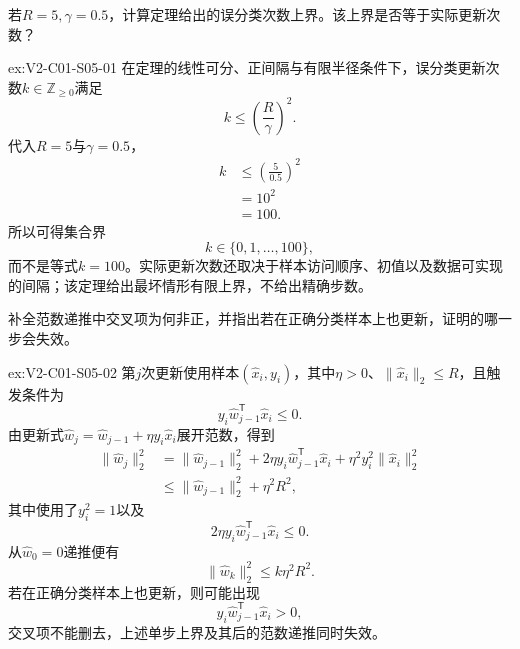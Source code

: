\begin{SLChapterExercisePairSection}
\begin{exercise}\label{ex:V2-C01-S05-01}
若$R=5,\gamma=0.5$，计算定理给出的误分类次数上界。该上界是否等于实际更新次数？
\end{exercise}
\ifSLFullEdition
{}\label{sol:V2-C01-S05-01}
\begin{chapterexercisesolution}{ex:V2-C01-S05-01}
在定理的线性可分、正间隔与有限半径条件下，误分类更新次数$k\in\mathbb Z_{\geq0}$满足
\[
k\leq\left(\frac{R}{\gamma}\right)^2.
\]
代入$R=5$与$\gamma=0.5$，
\[
\begin{aligned}
k
&\leq\left(\frac{5}{0.5}\right)^2\\
&=10^2\\
&=100.
\end{aligned}
\]
所以可得集合界
\[
k\in\{0,1,\ldots,100\},
\]
而不是等式$k=100$。实际更新次数还取决于样本访问顺序、初值以及数据可实现的间隔；该定理给出最坏情形有限上界，不给出精确步数。
\end{chapterexercisesolution}
\fi

\begin{exercise}\label{ex:V2-C01-S05-02}
补全范数递推中交叉项为何非正，并指出若在正确分类样本上也更新，证明的哪一步会失效。
\end{exercise}
\ifSLFullEdition
{}\label{sol:V2-C01-S05-02}
\begin{chapterexercisesolution}{ex:V2-C01-S05-02}
第$j$次更新使用样本$(\widehat x_i,y_i)$，其中$\eta>0$、$\lVert\widehat x_i\rVert_2\leq R$，且触发条件为
\[
y_i\widehat w_{j-1}^{\mathsf T}\widehat x_i\leq0.
\]
由更新式$\widehat w_j=\widehat w_{j-1}+\eta y_i\widehat x_i$展开范数，得到
\[
\begin{aligned}
\lVert\widehat w_j\rVert_2^2
&=\lVert\widehat w_{j-1}\rVert_2^2
+2\eta y_i\widehat w_{j-1}^{\mathsf T}\widehat x_i
+\eta^2y_i^2\lVert\widehat x_i\rVert_2^2\\
&\leq\lVert\widehat w_{j-1}\rVert_2^2
+\eta^2R^2,
\end{aligned}
\]
其中使用了$y_i^2=1$以及
\[
2\eta y_i\widehat w_{j-1}^{\mathsf T}\widehat x_i\leq0.
\]
从$\widehat w_0=0$递推便有
\[
\lVert\widehat w_k\rVert_2^2\leq k\eta^2R^2.
\]
若在正确分类样本上也更新，则可能出现
\[
y_i\widehat w_{j-1}^{\mathsf T}\widehat x_i>0,
\]
交叉项不能删去，上述单步上界及其后的范数递推同时失效。
\end{chapterexercisesolution}
\fi


\end{SLChapterExercisePairSection}
